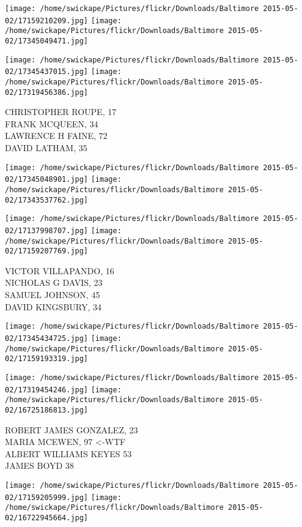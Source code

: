 \documentclass[10pt,letterpaper]{article}
\begin{document}
\texttt{[image: /home/swickape/Pictures/flickr/Downloads/Baltimore 2015-05-02/17159210209.jpg]}
\texttt{[image: /home/swickape/Pictures/flickr/Downloads/Baltimore 2015-05-02/17345049471.jpg]}

\texttt{[image: /home/swickape/Pictures/flickr/Downloads/Baltimore 2015-05-02/17345437015.jpg]}
\texttt{[image: /home/swickape/Pictures/flickr/Downloads/Baltimore 2015-05-02/17319456386.jpg]}

CHRISTOPHER ROUPE, 17\\
FRANK MCQUEEN, 34\\
LAWRENCE H FAINE, 72\\
DAVID LATHAM, 35
\pagebreak

\texttt{[image: /home/swickape/Pictures/flickr/Downloads/Baltimore 2015-05-02/17345048901.jpg]}
\texttt{[image: /home/swickape/Pictures/flickr/Downloads/Baltimore 2015-05-02/17343537762.jpg]}

\texttt{[image: /home/swickape/Pictures/flickr/Downloads/Baltimore 2015-05-02/17137998707.jpg]}
\texttt{[image: /home/swickape/Pictures/flickr/Downloads/Baltimore 2015-05-02/17159207769.jpg]}

VICTOR VILLAPANDO, 16\\
NICHOLAS G DAVIS, 23\\
SAMUEL JOHNSON, 45\\
DAVID KINGSBURY, 34
\pagebreak

\texttt{[image: /home/swickape/Pictures/flickr/Downloads/Baltimore 2015-05-02/17345434725.jpg]}
\texttt{[image: /home/swickape/Pictures/flickr/Downloads/Baltimore 2015-05-02/17159193319.jpg]}

\texttt{[image: /home/swickape/Pictures/flickr/Downloads/Baltimore 2015-05-02/17319454246.jpg]}
\texttt{[image: /home/swickape/Pictures/flickr/Downloads/Baltimore 2015-05-02/16725186813.jpg]}

ROBERT JAMES GONZALEZ, 23\\
MARIA MCEWEN, 97 <{-}WTF\\
ALBERT WILLIAMS KEYES 53\\
JAMES BOYD 38
\pagebreak

\texttt{[image: /home/swickape/Pictures/flickr/Downloads/Baltimore 2015-05-02/17159205999.jpg]}
\texttt{[image: /home/swickape/Pictures/flickr/Downloads/Baltimore 2015-05-02/16722945664.jpg]}
\end{document}
